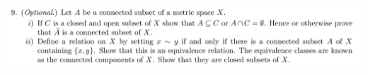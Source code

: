 \documentclass[12pt]{article}
\begin{document}
\subsection{}
\begin{mdframed}
\includegraphics[width=400pt]{img/oxford-a2-2-9.png}
\end{mdframed}
\end{document}
